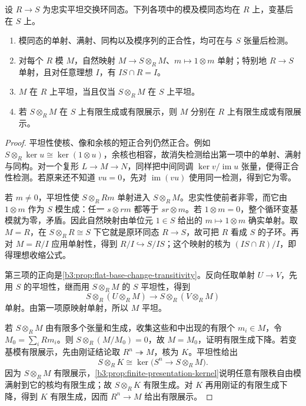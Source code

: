 \begin{proposition}\label{b3:prop:faithfully-flat-detection}
	设 \(R\to S\) 为忠实平坦交换环同态。下列各项中的模及模同态均在 \(R\) 上，变基后在 \(S\) 上。
	\begin{enumerate}
		\item 模同态的单射、满射、同构以及模序列的正合性，均可在与 \(S\) 张量后检测。
		\item 对每个 \(R\) 模 \(M\)，自然映射 \(M\to S\otimes_RM\)、\(m\mapsto1\otimes m\) 单射；特别地 \(R\to S\) 单射，且对任意理想 \(I\)，有 \(IS\cap R=I\)。
		\item \(M\) 在 \(R\) 上平坦，当且仅当 \(S\otimes_RM\) 在 \(S\) 上平坦。
		\item 若 \(S\otimes_RM\) 在 \(S\) 上有限生成或有限展示，则 \(M\) 分别在 \(R\) 上有限生成或有限展示。
	\end{enumerate}
\end{proposition}
\begin{proof}
	平坦性使核、像和余核的短正合列仍然正合。例如 \(S\otimes_R\ker u\cong\ker(1\otimes u)\)，余核也相容，故消失检测给出第一项中的单射、满射与同构。对一个复形 \(L\to M\to N\)，同样把中间同调 \(\ker v/\operatorname{im}u\) 张量，便得正合性检测。若原来还不知道 \(vu=0\)，先对 \(\operatorname{im}(vu)\) 使用同一检测，得到它为零。

	若 \(m\ne0\)，平坦性使 \(S\otimes_RRm\) 单射进入 \(S\otimes_RM\)。忠实性使前者非零，而它由 \(1\otimes m\) 作为 \(S\) 模生成：任一 \(s\otimes rm\) 都等于 \(sr\otimes m\)。若 \(1\otimes m=0\)，整个循环变基模就为零，矛盾。因此自然映射由单位元 \(1\in S\) 给出的 \(m\mapsto1\otimes m\) 确实单射。取 \(M=R\)，在 \(S\otimes_RR\cong S\) 下它就是原环同态 \(R\to S\)，故可把 \(R\) 看成 \(S\) 的子环。再对 \(M=R/I\) 应用单射性，得到 \(R/I\hookrightarrow S/IS\)；这个映射的核为 \((IS\cap R)/I\)，即得理想收缩公式。

	第三项的正向是\cref{b3:prop:flat-base-change-transitivity}。反向任取单射 \(U\to V\)，先用 \(S\) 的平坦性，继而用 \(S\otimes_RM\) 的 \(S\) 平坦性，得到
	\[
		S\otimes_R(U\otimes_RM)\longrightarrow S\otimes_R(V\otimes_RM)
	\]
	单射。由第一项原映射单射，所以 \(M\) 平坦。

	若 \(S\otimes_RM\) 由有限多个张量和生成，收集这些和中出现的有限个 \(m_i\in M\)，令 \(M_0=\sum_iRm_i\)。则 \(S\otimes_R(M/M_0)=0\)，故 \(M=M_0\)，证明有限生成下降。若变基模有限展示，先由刚证结论取 \(R^n\twoheadrightarrow M\)，核为 \(K\)。平坦性给出
	\[
		S\otimes_RK\cong\ker\bigl(S^n\longrightarrow S\otimes_RM\bigr).
	\]
	因为 \(S\otimes_RM\) 有限展示，\cref{b3:prop:finite-presentation-kernel}说明任意有限秩自由模满射到它的核均有限生成；故 \(S\otimes_RK\) 有限生成。对 \(K\) 再用刚证的有限生成下降，得到 \(K\) 有限生成，因而 \(R^n\to M\) 给出有限展示。
\end{proof}

